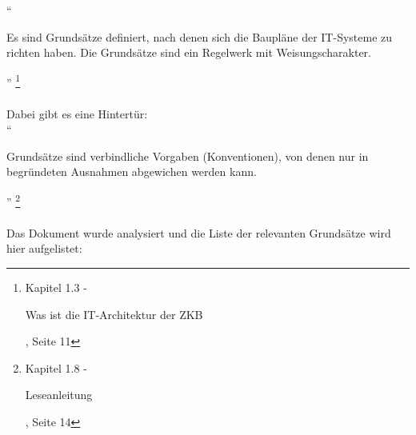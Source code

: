 \documentclass[
11pt, %
a4paper, %
BCOR25mm, %
DIV14, %
footsepline = false, %
headsepline, %
twoside, %
openright,
abstracton, %
listof=totocnumbered, %
bibliography=totocnumbered %
]{scrreprt}
\begin{document}
  ``\begin{itshape}Es sind Grundsätze definiert, nach denen sich die Baupläne
  der IT-Systeme zu richten haben. Die Grundsätze sind ein Regelwerk mit
  Weisungscharakter.\end{itshape}''
  \footnote{\cite{ZkbHandbuchDerItArchitektur} Kapitel 1.3 - \begin{itshape}Was ist die IT-Architektur der
  ZKB\end{itshape}, Seite 11}
  \\
  \\
  \noindent
  Dabei gibt es eine Hintertür:\\

  ``\begin{itshape}Grundsätze sind verbindliche Vorgaben (Konventionen), von
  denen nur in begründeten Ausnahmen abgewichen werden kann.\end{itshape}''
  \footnote{\cite{ZkbHandbuchDerItArchitektur} Kapitel 1.8 - \begin{itshape}Leseanleitung\end{itshape},
  Seite 14}
  \\
  \\
  \noindent
  Das Dokument wurde analysiert und die Liste der relevanten Grundsätze wird
  hier aufgelistet:
  
\end{document}

